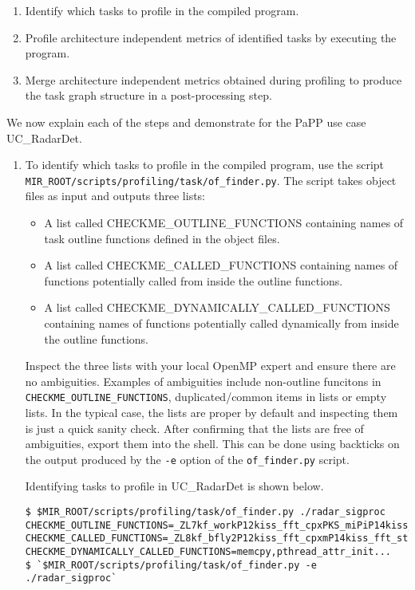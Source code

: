 \documentclass[11pt,a4paper]{article}
\begin{document}
\begin{enumerate}
    \item Identify which tasks to profile in the compiled program.
    \item Profile architecture independent metrics of identified tasks by executing the program.
    \item Merge architecture independent metrics obtained during profiling to produce the task graph structure in a post-processing step.
\end{enumerate}

We now explain each of the steps and demonstrate for the PaPP use case UC\_RadarDet.

\begin{enumerate}
    \item To identify which tasks to profile in the compiled program, use the script \\ \texttt{MIR\_ROOT/scripts/profiling/task/of\_finder.py}. The script takes object files as input and outputs three lists:
        \begin{itemize}
            \item A list called CHECKME\_OUTLINE\_FUNCTIONS containing names of task outline functions defined in the object files.
            \item A list called CHECKME\_CALLED\_FUNCTIONS containing names of functions potentially called from inside the outline functions.
            \item A list called CHECKME\_DYNAMICALLY\_CALLED\_FUNCTIONS containing names of functions potentially called dynamically from inside the outline functions.
        \end{itemize}

Inspect the three lists with your local OpenMP expert and ensure there are no ambiguities. Examples of ambiguities include non-outline funcitons in \texttt{CHECKME\_OUTLINE\_FUNCTIONS}, duplicated/common items in lists or empty lists. In the typical case, the lists are proper by default and inspecting them is just a quick sanity check. After confirming that the lists are free of ambiguities, export them into the shell. This can be done using backticks on the output produced by the \texttt{-e} option of the \texttt{of\_finder.py} script.

Identifying tasks to profile in UC\_RadarDet is shown below.

\begin{lstlisting}[style=MyInputStyle]
$ $MIR_ROOT/scripts/profiling/task/of_finder.py ./radar_sigproc
CHECKME_OUTLINE_FUNCTIONS=_ZL7kf_workP12kiss_fft_cpxPKS_miPiP14kiss_fft_state._omp_fn.0,...
CHECKME_CALLED_FUNCTIONS=_ZL8kf_bfly2P12kiss_fft_cpxmP14kiss_fft_statei,...
CHECKME_DYNAMICALLY_CALLED_FUNCTIONS=memcpy,pthread_attr_init...
$ `$MIR_ROOT/scripts/profiling/task/of_finder.py -e ./radar_sigproc`
\end{lstlisting}


\end{enumerate}
\end{document}

